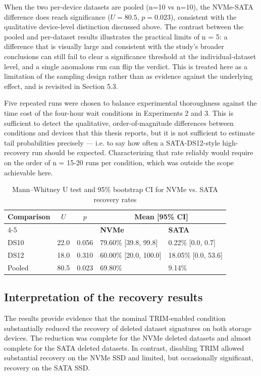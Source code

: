 When the two per-device datasets are pooled (n=10 vs n=10), the NVMe-SATA difference does reach significance ($U = 80.5$, $p = 0.023$), consistent with the qualitative device-level 
distinction discussed above. The contrast between the pooled and per-dataset results illustrates the practical limits of n = 5: a difference that is visually large and 
consistent with the study's broader conclusions can still fail to clear a significance threshold at the individual-dataset level, and a single anomalous run can flip 
the verdict. This is treated here as a limitation of the sampling design rather than as evidence against the underlying effect, and is revisited in Section 5.3.

Five repeated runs were chosen to balance experimental thoroughness against the time cost of the four-hour wait conditions in Experiments 2 and 3. This is sufficient 
to detect the qualitative, order-of-magnitude differences between conditions and devices that this thesis reports, but it is not sufficient to estimate tail 
probabilities precisely — i.e. to say how often a SATA-DS12-style high-recovery run should be expected. Characterizing that rate reliably would require on the order of 
n = 15-20 runs per condition, which was outside the scope achievable here.


\begin{table}[h]
\centering
\caption{Mann--Whitney U test and 95\% bootstrap CI for NVMe vs. SATA recovery rates}
\label{tab:mwu}
\begin{tabular}{l c c l l}
\toprule
\textbf{Comparison} & \textbf{$U$} & \textbf{$p$} & \multicolumn{2}{c}{\textbf{Mean [95\% CI]}} \\
\cmidrule(lr){4-5}
& & & \textbf{NVMe} & \textbf{SATA} \\
\midrule
DS10 & 22.0 & 0.056 & 79.60\% [39.8, 99.8] & 0.22\% [0.0, 0.7] \\
DS12 & 18.0 & 0.310 & 60.00\% [20.0, 100.0] & 18.05\% [0.0, 53.6] \\
Pooled & 80.5 & 0.023 & 69.80\% & 9.14\% \\
\bottomrule
\end{tabular}
\end{table}


\subsection*{Interpretation of the recovery results}
The results provide evidence that the nominal TRIM-enabled condition substantially reduced the recovery of deleted dataset signatures on both storage devices. The 
reduction was complete for the NVMe deleted datasets and almost complete for the SATA deleted datasets. In contrast, disabling TRIM allowed substantial recovery on the 
NVMe SSD and limited, but occasionally significant, recovery on the SATA SSD.

